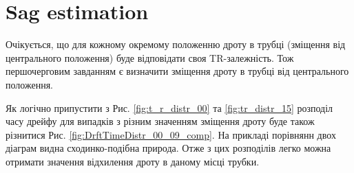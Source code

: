 \documentclass[]{article}
\begin{document}

			
	 
	
	
	\section{ Sag estimation}
	
	Очікується, що для кожному окремому положенню дроту в трубці (зміщення від центрального положення) буде відповідати своя TR-залежність. Тож першочерговим завданням є визначити зміщення дроту в  трубці від центрального положення.
	
	Як логічно припустити з Рис. \ref{fig:t_r_distr_00} та \ref{fig:tr_distr_15} розподіл часу дрейфу  для випадків з різним значенням зміщення дроту буде також різнитися Рис. \ref{fig:DrftTimeDistr_00_09_comp}. На прикладі порівнянн  двох діаграм видна сходинко-подібна природа.
	Отже з цих розподілів легко можна отримати значення відхилення дроту в даному місці трубки.
	
\end{document}
